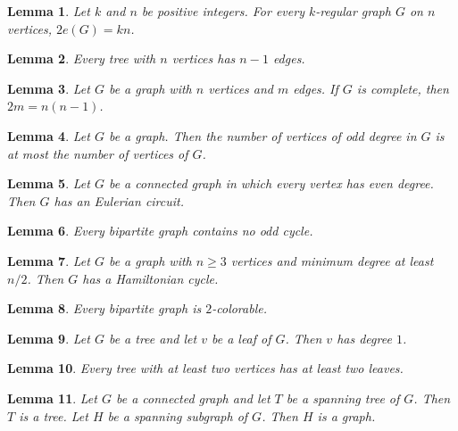 \documentclass{article}
\newtheorem{lemma}{Lemma}
\begin{document}
\begin{lemma}\label{regular}
Let $k$ and $n$ be positive integers. For every $k$-regular graph $G$ on $n$ vertices, $2e(G)=kn$.
\end{lemma}

\begin{lemma}\label{tree-edges}
Every tree with $n$ vertices has $n-1$ edges.
\end{lemma}

\begin{lemma}\label{implicit-counts}
Let $G$ be a graph with $n$ vertices and $m$ edges. If $G$ is complete, then $2m=n(n-1)$.
\end{lemma}

\begin{lemma}\label{handshake-odd}
Let $G$ be a graph. Then the number of vertices of odd degree in $G$ is at most the number of vertices of $G$.
\end{lemma}

\begin{lemma}\label{euler}
Let $G$ be a connected graph in which every vertex has even degree. Then $G$ has an Eulerian circuit.
\end{lemma}

\begin{lemma}\label{bipartite-odd-cycle}
Every bipartite graph contains no odd cycle.
\end{lemma}

\begin{lemma}\label{dirac}
Let $G$ be a graph with $n\ge3$ vertices and minimum degree at least $n/2$. Then $G$ has a Hamiltonian cycle.
\end{lemma}

\begin{lemma}\label{bipartite-two}
Every bipartite graph is $2$-colorable.
\end{lemma}

\begin{lemma}\label{leaf-degree}
Let $G$ be a tree and let $v$ be a leaf of $G$. Then $v$ has degree $1$.
\end{lemma}

\begin{lemma}\label{two-leaves}
Every tree with at least two vertices has at least two leaves.
\end{lemma}

\begin{lemma}\label{spanning}
Let $G$ be a connected graph and let $T$ be a spanning tree of $G$. Then $T$ is a tree. Let $H$ be a spanning subgraph of $G$. Then $H$ is a graph.
\end{lemma}
\end{document}

